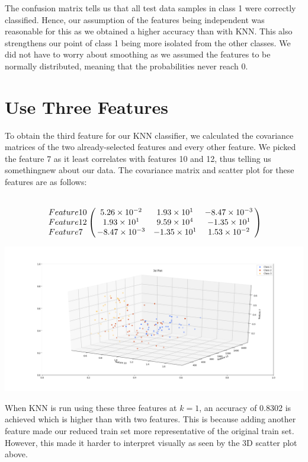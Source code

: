 \documentclass[11pt]{article}
\begin{document}
The confusion matrix tells us that all test data samples in class 1 were correctly classified. Hence, our assumption of the features being independent was reasonable for this as we obtained a higher accuracy than with KNN. This also strengthens our point of class 1 being more isolated from the other classes. We did not have to worry about smoothing as we assumed the features to be normally distributed, meaning that the probabilities never reach 0.

\section{Use Three Features}
To obtain the third feature for our KNN classifier, we calculated the covariance matrices of the two already-selected features and every other feature. We picked the feature 7 as it least correlates with features 10 and 12, thus telling us somethingnew about our data. The covariance matrix and scatter plot for these features are as follows:

$$
\bordermatrix{ ~ & ~ & ~ & ~ \cr
Feature 10 & 5.26\times10^{-2} & 1.93\times10^1 & -8.47\times10^{-3} \cr
Feature 12 & 1.93\times10^1 & 9.59\times10^4 & -1.35\times10^1 \cr
Feature 7 & -8.47\times10^{-3} & -1.35\times10^1 & 1.53\times10^{-2} \cr}
$$

\begin{center}
\includegraphics[scale=0.25]{3d_plot}
\end{center}

When KNN is run using these three features at $k = 1$, an accuracy of 0.8302 is achieved which is higher than with two features. This is because adding another feature made our reduced train set more representative of the original train set. However, this made it harder to interpret visually as seen by the 3D scatter plot above.
\end{document}
